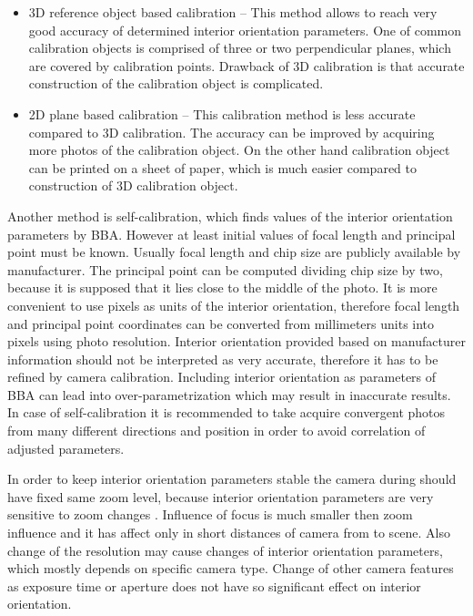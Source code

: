 \documentclass[a4paper,12pt]{article}
\begin{document}

\begin{itemize}
\item 3D reference object based calibration -- This method allows to reach very good accuracy of determined 
interior orientation parameters. One of common calibration objects is comprised of three or two
perpendicular planes, which are covered by calibration points. Drawback of 3D calibration 
is that accurate construction of the calibration object is complicated.
\item 2D plane based calibration -- This calibration method is less accurate compared to 3D calibration. 
The accuracy can be improved by acquiring more photos of the calibration object.
On the other hand calibration object can be printed on a sheet of paper, which is much 
easier compared to construction of 3D calibration object.
\end{itemize}


Another method is self-calibration, which finds values of the interior orientation parameters by BBA.
However at least initial values of focal length and principal point must be known.
Usually focal length and chip size are publicly available by manufacturer. The principal point 
can be computed dividing chip size by two, because it is supposed that it lies close to 
the middle of the photo.
It is more convenient to use 
pixels as units of the interior orientation, therefore focal length and principal point coordinates can be 
converted from millimeters units into pixels using photo resolution. 
Interior orientation provided based on manufacturer information should not be interpreted as very accurate, therefore 
it has  to be refined by camera calibration.
Including interior orientation as parameters of BBA
can lead into over-parametrization which may result in inaccurate results.
In case of self-calibration it is recommended to take acquire convergent photos from many different directions and position in order
to avoid correlation of adjusted parameters. 


In order to keep interior orientation parameters stable the camera during should have fixed same zoom level,
because interior orientation parameters are very sensitive  to zoom changes \cite{labe2004geometric}.
Influence of focus is  much smaller then zoom influence and it has affect only in short distances of camera
from to scene.
Also change of the resolution may cause changes of interior orientation parameters, which mostly depends 
on specific camera type. 
Change of other camera features as exposure time or aperture does not have so significant effect on interior
orientation.
\end{document}
